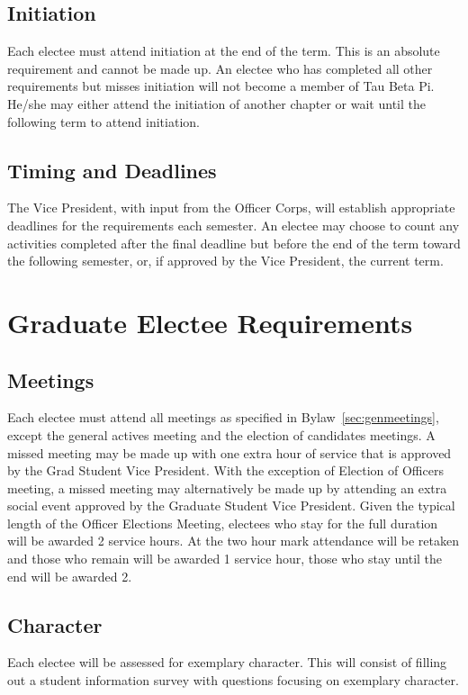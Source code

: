 \section{Initiation} Each electee must attend initiation at the end of the term. This is an absolute requirement and cannot be made up. An electee who has completed all other requirements but misses initiation will not become a member of Tau Beta Pi. He/she may either attend the initiation of another chapter or wait until the following term to attend initiation.
\section{Timing and Deadlines}  The Vice President, with input from the Officer Corps, will establish appropriate deadlines for the requirements each semester. An electee may choose to count any activities completed after the final deadline but before the end of the term toward the following semester, or, if approved by the Vice President, the current term.

\chapter{Graduate Electee Requirements}\label{sec:gradreqs}%
\section{Meetings} Each electee must attend all meetings as specified in Bylaw~\ref{sec:genmeetings}, except the general actives meeting and the election of candidates  meetings. A missed meeting may be made up with one extra hour of service that is approved by the Grad Student Vice President. 
With the exception of Election of Officers meeting, a missed meeting may alternatively be made up by attending an extra social event approved by the Graduate Student Vice President. Given the typical length of the Officer Elections Meeting, electees who stay for the full duration will be awarded 2 service hours. At the two hour mark attendance will be retaken and those who remain will be awarded 1 service hour, those who stay until the end will be awarded 2.
\section{Character} Each electee will be assessed for exemplary character. This
will consist of filling out a student information survey with questions focusing on exemplary character.
